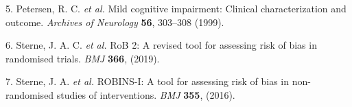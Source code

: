 \documentclass[a4paper, nobind]{templates/ociamthesis}
\newcommand*{\bibtitle}{Bibliography}
\begin{document}
\leavevmode\hypertarget{ref-petersen1999}{}%
5. Petersen, R. C. \emph{et al.} Mild cognitive impairment: Clinical characterization and outcome. \emph{Archives of Neurology} \textbf{56}, 303--308 (1999).

\leavevmode\hypertarget{ref-sterne2019}{}%
6. Sterne, J. A. C. \emph{et al.} RoB 2: A revised tool for assessing risk of bias in randomised trials. \emph{BMJ} \textbf{366}, (2019).

\leavevmode\hypertarget{ref-sterne2016}{}%
7. Sterne, J. A. \emph{et al.} ROBINS-I: A tool for assessing risk of bias in non-randomised studies of interventions. \emph{BMJ} \textbf{355}, (2016).




\setlength{\baselineskip}{0pt} %

{\renewcommand*\MakeUppercase[1]{#1}%
\printbibliography[heading=bibintoc,title={\bibtitle}]}
\end{document}
